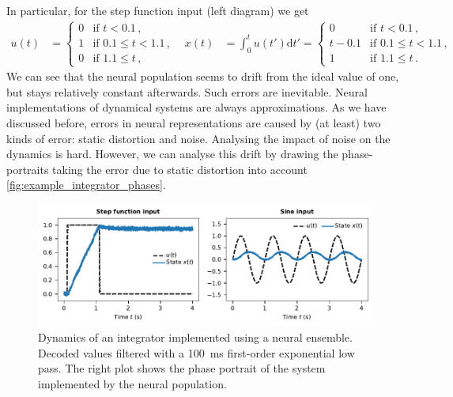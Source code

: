 \documentclass[10pt,letterpaper,oneside]{article}
\begin{document}
In particular, for the step function input (left diagram) we get
\begin{align*}
	u(t) &= \begin{cases}
		0 & \text{if } t < 0.1 \,, \\
		1 & \text{if } 0.1 \leq t < 1.1 \,, \\
		0 & \text{if } 1.1 \leq t \,,
		\end{cases} &
	x(t) &= \int_{0}^t u(t') \mathrm{d}t' = \begin{cases}
		0 & \text{if } t < 0.1 \,, \\
		t - 0.1 & \text{if } 0.1 \leq t < 1.1 \,, \\
		1 & \text{if } 1.1 \leq t \,.
	\end{cases}
\end{align*}
We can see that the neural population seems to drift from the ideal value of one, but stays relatively constant afterwards. Such errors are inevitable. Neural implementations of dynamical systems are always approximations. As we have discussed before, errors in neural representations are caused by (at least) two kinds of error: static distortion and noise. Analysing the impact of noise on the dynamics is hard. However, we can analyse this drift by drawing the phase-portraits taking the error due to static distortion into account \cref{fig:example_integrator_phases}.

\begin{figure}
	\centering
	\includegraphics{media/example_integrator.pdf}
	\caption{Dynamics of an integrator implemented using a neural ensemble. Decoded values filtered with a \SI{100}{\milli\second} first-order exponential low pass. The right plot shows the phase portrait of the system implemented by the neural population.  }
	\label{fig:example_integrator}
\end{figure}
\end{document}
